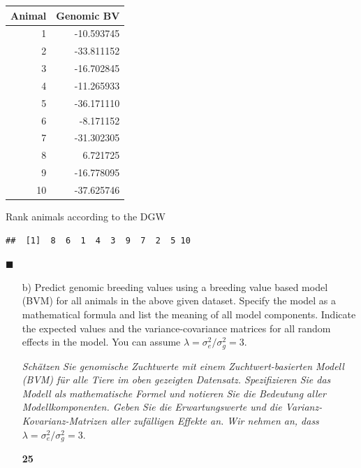 \documentclass[
]{article}
\newenvironment{Shaded}{\begin{snugshade}}{\end{snugshade}}
\newcommand{\AttributeTok}[1]{\textcolor[rgb]{0.77,0.63,0.00}{#1}}
\newcommand{\ConstantTok}[1]{\textcolor[rgb]{0.00,0.00,0.00}{#1}}
\newcommand{\FunctionTok}[1]{\textcolor[rgb]{0.00,0.00,0.00}{#1}}
\newcommand{\NormalTok}[1]{#1}
\newcommand{\SpecialCharTok}[1]{\textcolor[rgb]{0.00,0.00,0.00}{#1}}
\newcommand{\StringTok}[1]{\textcolor[rgb]{0.31,0.60,0.02}{#1}}
\newcommand{\points}[1]
{\begin{flushright}\textbf{#1}\end{flushright}}
\newcommand{\solend}
{\vspace{2ex}$\blacksquare$}
\begin{document}
\begin{longtable}[]{@{}rr@{}}
\toprule()
Animal & Genomic BV \\
\midrule()
\endhead
1 & -10.593745 \\
2 & -33.811152 \\
3 & -16.702845 \\
4 & -11.265933 \\
5 & -36.171110 \\
6 & -8.171152 \\
7 & -31.302305 \\
8 & 6.721725 \\
9 & -16.778095 \\
10 & -37.625746 \\
\bottomrule()
\end{longtable}

Rank animals according to the DGW

\begin{Shaded}
\end{Shaded}

\begin{verbatim}
##  [1]  8  6  1  4  3  9  7  2  5 10
\end{verbatim}

\solend

\clearpage
\pagebreak

\begin{enumerate}
\item[b)] Predict genomic breeding values using a breeding value based model (BVM) for all animals in the above given dataset. Specify the model as a mathematical formula and list the meaning of all model components. Indicate the expected values and the variance-covariance matrices for all random effects in the model. You can assume $\lambda = \sigma_e^2 / \sigma_g^2 = 3$.

\textit{Schätzen Sie genomische Zuchtwerte mit einem Zuchtwert-basierten Modell (BVM) für alle Tiere im oben gezeigten Datensatz. Spezifizieren Sie das Modell als mathematische Formel und notieren Sie die Bedeutung aller Modellkomponenten. Geben Sie die Erwartungswerte und die Varianz-Kovarianz-Matrizen aller zufälligen Effekte an. Wir nehmen an, dass } $\lambda = \sigma_e^2 / \sigma_g^2 = 3$.
\points{25}
\end{enumerate}
\end{document}
